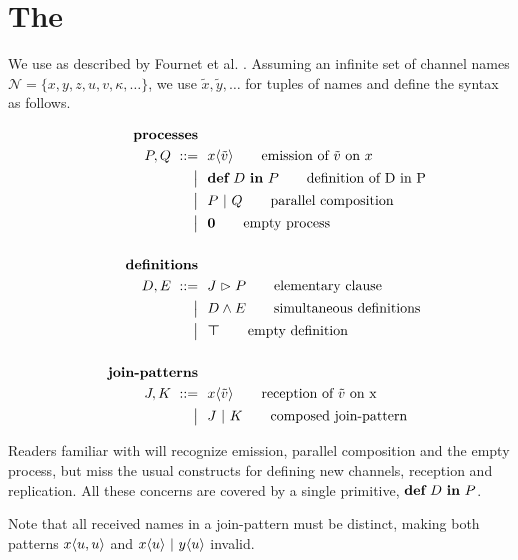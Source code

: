 \section{The \JoinCalc}



We use \joincalc as described by Fournet et al.
\cite{fournet_calculus_1996}.
Assuming an infinite set of channel names
$ \mathcal{N} = \{ x, y, z, u, v, \kappa, \ldots \} $,
we use
$ \tilde{x}, \tilde{y}, \ldots $
for tuples of names
and define the syntax as follows.

\begin{align}
  \tag*{\textbf{processes}}
  \\
  P, Q
  \grmr \jsnd{x}{\tilde{v}}   \tag*{emission of $\tilde{v}$ on $x$}
  \altn \nonumber \jdef{D}{P} \tag*{definition of D in P}
  \altn P \jpar Q             \tag*{parallel composition}
  \altn \jnullproc            \tag*{empty process}
  \\ \nonumber
  \\
  \tag*{\textbf{definitions}}
  \\
  D, E
  \grmr \jrct{J}{P} \tag*{elementary clause}
  \altn D \jcon E   \tag*{simultaneous definitions}
  \altn \jnulldef   \tag*{empty definition}
  \\ \nonumber
  \\
  \tag*{\textbf{join-patterns}}
  \\
  J, K
  \grmr \jrcv{x}{\tilde{v}} \tag*{reception of $\tilde{v}$ on x}
  \altn J \jpat K           \tag*{composed join-pattern}
\end{align}

Readers familiar with \asyncpicalc will recognize emission,
parallel composition and the empty process, but miss the usual constructs for
defining new channels, reception and replication.
All these concerns are covered by a single primitive,
$ \textbf{def} \ D \ \textbf{in} \ P $.


Note that all received names in a join-pattern must be distinct,
making both patterns
$ x\langle u,u\rangle $ and
$ x\langle u\rangle \ |\  y\langle u\rangle $
invalid.


